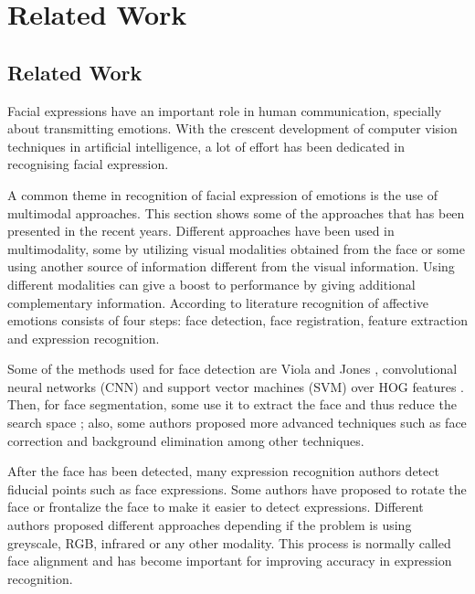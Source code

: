 \chapter{Related Work}
\label{chapter:relatedwork}

\section{Related Work}

Facial expressions have an important role in human communication, specially about transmitting emotions. With the crescent development of computer vision techniques in artificial intelligence, a lot of effort has been dedicated in recognising facial expression.



A common theme in recognition of facial expression of emotions is the use of multimodal approaches.  This section shows some of the approaches that has been presented in the recent years. Different approaches have been used in multimodality, some by utilizing visual modalities obtained from the face or some using another source of information different from the visual information. Using different modalities can give a boost to performance by giving additional complementary information. According to literature recognition of affective emotions consists of four steps: face detection, face registration, feature extraction and expression recognition. 

Some of the methods used for face detection are Viola and Jones \cite{ViolaRapidFeatures}, convolutional neural networks (CNN) \cite{Dalal2005HistogramsDetection} and support vector machines (SVM) over HOG features \cite{Osadchy2007SynergisticModels}. Then, for face segmentation, some use it to extract the face and thus reduce the search space \cite{VijayLakshmi2010SegmentationTechniques}; also, some authors proposed more advanced techniques such as face correction and background elimination among other techniques. 

After the face has been detected, many expression recognition authors detect fiducial points such as face expressions. Some authors have proposed to rotate the face or frontalize the face to make it easier to detect expressions. Different authors proposed different approaches depending if the problem is using greyscale, RGB, infrared or any other modality. This process is normally called face alignment and has become important for improving accuracy in expression recognition.

